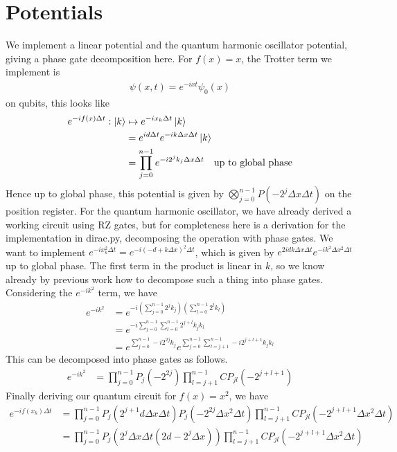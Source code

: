 \documentclass[10pt]{article}
\begin{document}
\section*{Potentials}
We implement a linear potential and the quantum harmonic oscillator potential,
giving a phase gate decomposition here.
For $f(x) = x$, the Trotter term we implement is
\begin{align*}
    \psi(x, t) = e^{-ixt} \psi_0(x)
\end{align*}
on qubits, this looks like
\begin{align*}
    e^{-if(x)\Delta t}: \ket{k} &\mapsto e^{-ix_k\Delta t} \ket{k} \\
    &= e^{id\Delta t} e^{-ik\Delta x \Delta t} \ket{k} \\
    &= \prod_{j=0}^{n-1} e^{-i2^jk_j \Delta x \Delta t} \text{\quad up to global phase}
\end{align*}
Hence up to global phase, this potential is given by $\bigotimes_{j=0}^{n-1} P(-2^j \Delta x \Delta t)$
on the position register. For the quantum harmonic oscillator, we have already
derived a working circuit using RZ gates, but for completeness here is a derivation
for the implementation in dirac.py, decomposing the operation with phase gates.
We want to implement $e^{-i x_k^2 \Delta t} = e^{-i (-d + k \Delta x)^2 \Delta t}$,
which is given by $e^{2idk\Delta x \Delta t}e^{-ik^2 \Delta x^2 \Delta t}$ up to global phase.
The first term in the product is linear in $k$, so we know already by previous work
how to decompose such a thing into phase gates. Considering the $e^{-ik^2}$ term, we have
\begin{align*}
    e^{-ik^2} &= e^{-i\left( \sum_{j=0}^{n-1} 2^j k_j \right) \left( \sum_{l=0}^{n-1} 2^l k_l \right)} \\
    &= e^{-i \sum_{j=0}^{n-1} \sum_{l=0}^{n-1} 2^{j+l} k_j k_l} \\
    &= e^{\sum_{j=0}^{n-1} -i2^{2j}k_j} e^{\sum_{j=0}^{n-1}\sum_{l=j+1}^{n-1}-i2^{j+l+1}k_j k_l}
\end{align*}
This can be decomposed into phase gates as follows.
\begin{align*}
    e^{-ik^2} &= \prod_{j=0}^{n-1} P_j(-2^{2j})\prod_{l=j+1}^{n-1}CP_{jl}(-2^{j+l+1})
\end{align*}
Finally deriving our quantum circuit for $f(x) = x^2$, we have
\begin{align*}
    e^{-if(x_k)\Delta t} &= \prod_{j=0}^{n-1} P_j(2^{j+1}d \Delta x \Delta t)P_j(-2^{2j}\Delta x^2 \Delta t)
    \prod_{l=j+1}^{n-1} CP_{jl}(-2^{j+l+1}\Delta x^2 \Delta t) \\
    &= \prod_{j=0}^{n-1} P_j(2^j \Delta x \Delta t(2d - 2^j \Delta x)) \prod_{l=j+1}^{n-1}CP_{jl}(-2^{j+l+1}\Delta x^2 \Delta t)
\end{align*}
\end{document}
